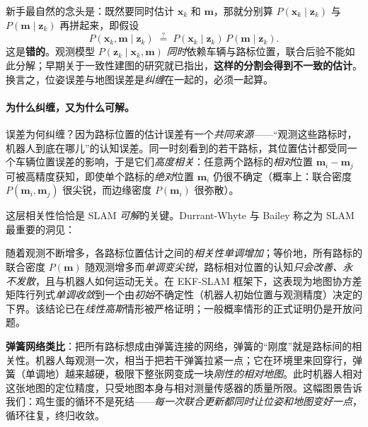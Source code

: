 \begin{pitfall}
新手最自然的念头是：既然要同时估计 $\mathbf{x}_k$ 和 $\mathbf{m}$，那就分别算 $P(\mathbf{x}_k\mid \mathbf{z}_k)$ 与 $P(\mathbf{m}\mid \mathbf{z}_k)$ 再拼起来，即假设
\begin{equation}
  P(\mathbf{x}_k,\mathbf{m}\mid \mathbf{z}_k)\;\overset{?}{=}\;P(\mathbf{x}_k\mid \mathbf{z}_k)\,P(\mathbf{m}\mid \mathbf{z}_k).
  \label{eq:intro-bad-partition}
\end{equation}
这是\textbf{错的}。观测模型 $P(\mathbf{z}_k\mid \mathbf{x}_k,\mathbf{m})$ \emph{同时}依赖车辆与路标位置，联合后验不能如此分解；早期关于一致性建图的研究就已指出，\textbf{这样的分割会得到不一致的估计}\cite{durrantwhyte2006slam}。换言之，位姿误差与地图误差是\emph{纠缠}在一起的，必须一起算。
\end{pitfall}

\paragraph{为什么纠缠，又为什么可解。}
误差为何纠缠？因为路标位置的估计误差有一个\emph{共同来源}——“观测这些路标时，机器人到底在哪儿”的认知误差\cite{durrantwhyte2006slam}。同一时刻看到的若干路标，其位置估计都受同一个车辆位置误差的影响，于是它们\emph{高度相关}：任意两个路标的\emph{相对}位置 $\mathbf{m}_i-\mathbf{m}_j$ 可被高精度获知，即使单个路标的\emph{绝对}位置 $\mathbf{m}_i$ 仍很不确定（概率上：联合密度 $P(\mathbf{m}_i,\mathbf{m}_j)$ 很尖锐，而边缘密度 $P(\mathbf{m}_i)$ 很弥散）。

这层相关性恰恰是 SLAM \emph{可解}的关键。Durrant-Whyte 与 Bailey\cite{durrantwhyte2006slam} 称之为 SLAM 最重要的洞见：

\begin{theorem}\label{thm:intro-convergence}
随着观测不断增多，各路标位置估计之间的\emph{相关性单调增加}；等价地，所有路标的联合密度 $P(\mathbf{m})$ 随观测增多而\emph{单调变尖锐}，路标相对位置的认知\emph{只会改善、永不发散}，且与机器人如何运动无关。在 EKF-SLAM 框架下，这表现为地图协方差矩阵行列式\emph{单调收敛}到一个由\emph{初始}不确定性（机器人初始位置与观测精度）决定的下界。该结论已在\emph{线性高斯}情形被严格证明；一般概率情形的正式证明仍是开放问题\cite{durrantwhyte2006slam}。
\end{theorem}

\begin{insight}
\textbf{弹簧网络类比}\cite{durrantwhyte2006slam}：把所有路标想成由弹簧连接的网络，弹簧的“刚度”就是路标间的相关性。机器人每观测一次，相当于把若干弹簧拉紧一点；它在环境里来回穿行，弹簧（单调地）越来越硬，极限下整张网变成一块\emph{刚性的相对地图}。此时机器人相对这张地图的定位精度，只受地图本身与相对测量传感器的质量所限。这幅图景告诉我们：鸡生蛋的循环不是死结——\emph{每一次联合更新都同时让位姿和地图变好一点}，循环往复，终归收敛。
\end{insight}


